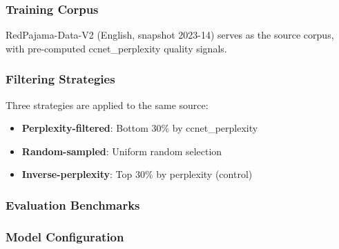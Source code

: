 
\subsubsection{Training Corpus}

RedPajama-Data-V2 (English, snapshot 2023-14) serves as the source corpus, with pre-computed ccnet\_perplexity quality signals.

\subsubsection{Filtering Strategies}

Three strategies are applied to the same source:
\begin{itemize}
\item \textbf{Perplexity-filtered}: Bottom 30\% by ccnet\_perplexity
\item \textbf{Random-sampled}: Uniform random selection
\item \textbf{Inverse-perplexity}: Top 30\% by perplexity (control)
\end{itemize}

\subsubsection{Evaluation Benchmarks}

\begin{table}[htbp]
\centering
{}
\end{table}

\subsubsection{Model Configuration}

\begin{table}[htbp]
\centering
{}
\end{table}

